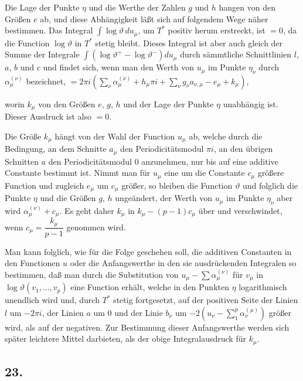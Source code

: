 \documentclass{article}
\begin{document}
Die Lage der Punkte $\eta$ und die Werthe der Zahlen $g$ und $h$ hangen von den Größen $e$ ab, und diese Abhängigkeit läßt sich auf folgendem Wege näher bestimmen. Das Integral $\displaystyle\int \log\vartheta\, du_{\mu}$, um $T^{*}$ positiv herum erstreckt, ist $= 0$, da die Function $\log\vartheta$ in $T^{*}$ stetig bleibt. Dieses Integral ist aber auch gleich der Summe der Integrale $\displaystyle\int (\log\vartheta^{+} - \log\vartheta^{-}) du_{\mu}$ durch sämmtliche Schnittlinien $l$, $a$, $b$ und $c$ und findet sich, wenn man den Werth von $u_{\mu}$ im Punkte $\eta_{\nu}$ durch $\alpha_{\mu}^{(\nu)}$ bezeichnet, $= 2\pi i \left(\displaystyle\sum_{\nu} \alpha_{\mu}^{(\nu)} + h_{\mu}\pi i + \sum_{\nu} g_{\nu} a_{\nu,\mu} - e_{\mu} + k_{\mu}\right)$,

worin $k_{\mu}$ von den Größen $e$, $g$, $h$ und der Lage der Punkte $\eta$ unabhängig ist. Dieser Ausdruck ist also $= 0$.

Die Größe $k_{\mu}$ hängt von der Wahl der Function $u_{\mu}$ ab, welche durch die Bedingung, an dem Schnitte $a_{\mu}$ den Periodicitätsmodul $\pi i$, an den übrigen Schnitten $a$ den Periodicitätsmodul 0 anzunehmen, nur bis auf eine additive Constante bestimmt ist. Nimmt man für $u_{\mu}$ eine um die Constante $c_{\mu}$ größere Function und zugleich $e_{\mu}$ um $c_{\mu}$ größer, so bleiben die Function $\vartheta$ und folglich die Punkte $\eta$ und die Größen $g$, $h$ ungeändert, der Werth von $u_{\mu}$ im Punkte $\eta_{\nu}$ aber wird $\alpha_{\mu}^{(\nu)} + c_{\mu}$. Es geht daher $k_{\mu}$ in $k_{\mu} - (p-1)c_{\mu}$ über und verschwindet, wenn $c_{\mu} = \dfrac{k_{\mu}}{p-1}$ genommen wird.

Man kann folglich, wie für die Folge geschehen soll, die additiven Constanten in den Functionen $u$ oder die Anfangswerthe in den sie ausdrückenden Integralen so bestimmen, daß man durch die Substitution von $u_{\mu} - \displaystyle\sum \alpha_{\mu}^{(\nu)}$ für $v_{\mu}$ in $\log\vartheta(v_{1}, \ldots, v_{p})$ eine Function erhält, welche in den Punkten $\eta$ logarithmisch unendlich wird und, durch $T^{*}$ stetig fortgesetzt, auf der positiven Seite der Linien $l$ um $-2\pi i$, der Linien $a$ um 0 und der Linie $b_{\nu}$ um $-2\left(u_{\nu} - \displaystyle\sum_{1}^{p} \alpha_{\nu}^{(\mu)}\right)$ größer wird, als auf der negativen. Zur Bestimmung dieser Anfangswerthe werden sich später leichtere Mittel darbieten, als der obige Integralausdruck für $k_{\mu}$.

\subsection*{23.}
\end{document}

